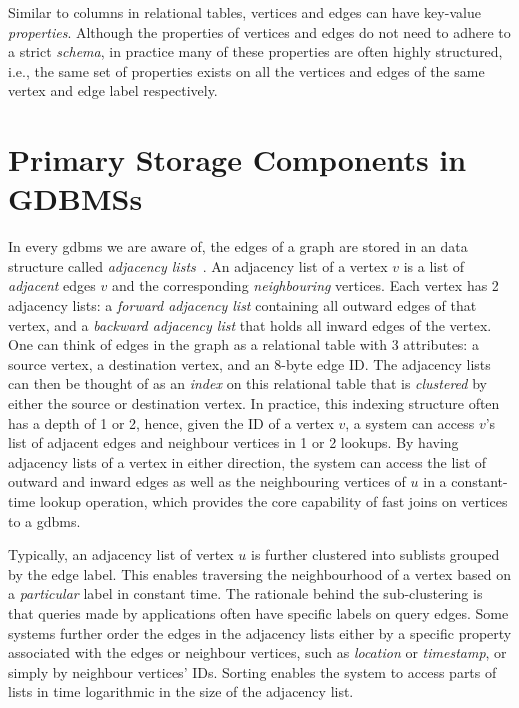 Similar to columns in relational tables, vertices and edges can have key-value \emph{properties}. Although the properties of vertices and edges do not need to adhere to a strict \emph{schema}, in practice many of these properties are often highly structured, i.e., the same set of properties exists on all the vertices and edges of the same vertex and edge label respectively.

\section{Primary Storage Components in GDBMSs}
\label{sec:storage-components}

In every \gls{gdbms} we are aware of, the edges of a graph are stored in an data structure called \emph{adjacency lists}~\cite{bonifati-adj-lists}. An adjacency list of a vertex $v$ is a list of \emph{adjacent} edges $v$ and the corresponding  \emph{neighbouring} vertices. Each vertex has 2 adjacency lists: a \emph{forward adjacency list} containing all outward edges of that vertex, and a \emph{backward adjacency list} that holds all inward edges of the vertex. One can think of edges in the graph as a relational table with 3 attributes: a source vertex, a destination vertex, and an 8-byte edge ID. The adjacency lists can then be thought of as an \emph{index} on this relational table that is \emph{clustered} by either the source or destination vertex. In practice, this indexing structure often has a depth of 1 or 2, hence, given the ID of a vertex $v$, a system can access $v$'s list of adjacent edges and neighbour vertices in 1 or 2 lookups. By having adjacency lists of a vertex in either direction, the system can access the list of outward and inward edges as well as the neighbouring vertices of $u$ in a constant-time lookup operation, which provides the core capability of fast joins on vertices to a \gls{gdbms}. 

Typically, an adjacency list of vertex $u$ is further clustered into sublists grouped by the edge label. This enables traversing the neighbourhood of a vertex based on a \emph{particular} label in constant time. The rationale behind the sub-clustering is that queries made by applications often have specific labels on query edges. Some systems further order the edges in the adjacency lists either by a specific property associated with the edges or neighbour vertices, such as \emph{location} or \emph{timestamp}, or simply by neighbour vertices' IDs. Sorting enables the system to access parts of lists in time logarithmic in the size of the adjacency list.

